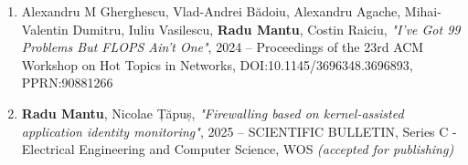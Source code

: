 {\begin{enumerate}
    \item Alexandru M Gherghescu, Vlad-Andrei Bădoiu, Alexandru Agache,
          Mihai-Valentin Dumitru, Iuliu Vasilescu, \textbf{Radu Mantu}, Costin
          Raiciu,
          \textit{"I've Got 99 Problems But FLOPS Ain't One"},
          2024 -- Proceedings of the 23rd ACM Workshop on Hot Topics in
          Networks,
          DOI:10.1145/3696348.3696893, PPRN:90881266

    \item \textbf{Radu Mantu}, Nicolae Țăpuș,
          \textit{"Firewalling based on kernel-assisted application identity monitoring"},
          2025 -- SCIENTIFIC BULLETIN, Series C - Electrical Engineering and
          Computer Science, WOS
          \textit{(accepted for publishing)}
\end{enumerate}
}

